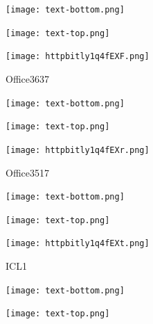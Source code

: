 \documentclass[letterpaper]{article}
\begin{document}
 \centerline{\texttt{[image: text-bottom.png]}} 
 
 \pagebreak 
{} 
 \vspace*{\fill} 
 
  \centerline{\texttt{[image: text-top.png]}} 
 
 \vspace{0.5in} 
 
 \begingroup 
 \centerline{\texttt{[image: httpbitly1q4fEXF.png]}} 
 \endgroup 
 \vspace*{\fill} 

 \hfill{\small Office3637} 

  \vspace{0.7in} 
 
 \centerline{\texttt{[image: text-bottom.png]}} 
 
 \pagebreak 
{} 
 \vspace*{\fill} 
 
  \centerline{\texttt{[image: text-top.png]}} 
 
 \vspace{0.5in} 
 
 \begingroup 
 \centerline{\texttt{[image: httpbitly1q4fEXr.png]}} 
 \endgroup 
 \vspace*{\fill} 

 \hfill{\small Office3517} 

  \vspace{0.7in} 
 
 \centerline{\texttt{[image: text-bottom.png]}} 
 
 \pagebreak 
{} 
 \vspace*{\fill} 
 
  \centerline{\texttt{[image: text-top.png]}} 
 
 \vspace{0.5in} 
 
 \begingroup 
 \centerline{\texttt{[image: httpbitly1q4fEXt.png]}} 
 \endgroup 
 \vspace*{\fill} 

 \hfill{\small ICL1} 

  \vspace{0.7in} 
 
 \centerline{\texttt{[image: text-bottom.png]}} 
 
 \pagebreak 
{} 
 \vspace*{\fill} 
 
  \centerline{\texttt{[image: text-top.png]}} 
 
 \vspace{0.5in} 
 
\end{document}
